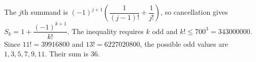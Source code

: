 The $j$th summand is $(-1)^{j+1}(\dfrac{1}{(j-1)!}+\dfrac{1}{j!})$, so cancellation gives $S_k=1+\dfrac{(-1)^{k+1}}{k!}$. The inequality requires $k$ odd and $k!\le700^3=343000000$. Since $11!=39916800$ and $13!=6227020800$, the possible odd values are $1,3,5,7,9,11$. Their sum is $\boxed{36}$.
